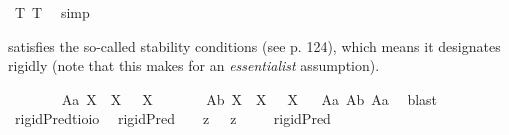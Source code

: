 \begin{isabellebody}
\isamarkupfalse%
\ T{}\ T{}\ \isamarkupfalse%
\ simp\ \ %
%
\endisatagproof
{\isafoldproof}%
%
\isadelimproof
%
\endisadelimproof
%
\isamarkuptrue%
%
\begin{isamarkuptext}%
\isa{{\isasymP}} satisfies the so-called stability conditions (see \cite{Fitting} p. 124), which means
 it designates rigidly (note that this makes for an \emph{essentialist} assumption).%
\end{isamarkuptext}\isamarkuptrue%
\isamarkupfalse%
\ \isanewline
\ \ \ \ \ \ A{}a{\isacharcolon}\ {\isachardoublequoteopen}{\isasymlfloor}\isactrlbold {\isasymforall}X{\isachardot}\ {\isasymP}\ X\ \isactrlbold {\isasymrightarrow}\ \isactrlbold {\isasymbox}{\isacharparenleft}{\isasymP}\ X{\isacharparenright}{\isasymrfloor}{\isachardoublequoteclose}\ \ \ \ \ \ %
\isanewline
{}\isamarkupfalse%
\ A{}b{\isacharcolon}\ {\isachardoublequoteopen}{\isasymlfloor}\isactrlbold {\isasymforall}X{\isachardot}\ \isactrlbold {\isasymnot}{\isacharparenleft}{\isasymP}\ X{\isacharparenright}\ \isactrlbold {\isasymrightarrow}\ \isactrlbold {\isasymbox}\isactrlbold {\isasymnot}{\isacharparenleft}{\isasymP}\ X{\isacharparenright}{\isasymrfloor}{\isachardoublequoteclose}%
\isadelimproof
\ %
\endisadelimproof
%
\isatagproof
{}\isamarkupfalse%
\ A{}a\ A{}b\ A{}a\ \isamarkupfalse%
\ blast%
\endisatagproof
{\isafoldproof}%
%
\isadelimproof
%
\endisadelimproof
\isanewline
\ \ \ \ \isanewline
{}\isamarkupfalse%
\ rigidPred{\isacharcolon}{\isacharcolon}{\isachardoublequoteopen}{\isacharparenleft}{\isacharprime}t{\isasymRightarrow}io{\isacharparenright}{\isasymRightarrow}io{\isachardoublequoteclose}\ \isanewline
\ {\isachardoublequoteopen}rigidPred\ {\isasymtau}\ {\isasymequiv}\ {\isacharparenleft}{\isasymlambda}{\isasymbeta}{\isachardot}\ \isactrlbold {\isasymbox}{\isacharparenleft}{\isacharparenleft}{\isasymlambda}z{\isachardot}\ {\isasymbeta}\ \isactrlbold {\isasymapprox}\ z{\isacharparenright}\ \isactrlbold {\isasymdown}{\isasymtau}{\isacharparenright}{\isacharparenright}\ \isactrlbold {\isasymdown}{\isasymtau}{\isachardoublequoteclose}\isanewline
\ \isanewline
{}\isamarkupfalse%
\ {\isachardoublequoteopen}{\isasymlfloor}rigidPred\ {\isasymP}{\isasymrfloor}{\isachardoublequoteclose}\ \isanewline

\end{isabellebody}
